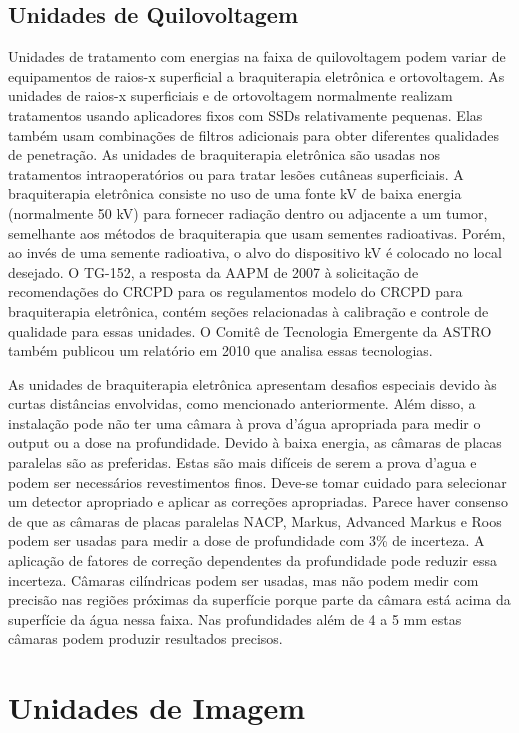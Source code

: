 \documentclass[11pt,a4paper]{article}
\begin{document}
\subsection*{Unidades de Quilovoltagem}

	Unidades de tratamento com energias na faixa de quilovoltagem podem variar de equipamentos de raios-x superficial a braquiterapia eletrônica e ortovoltagem. As unidades de raios-x superficiais e de ortovoltagem normalmente realizam tratamentos usando aplicadores fixos com SSDs relativamente pequenas. Elas também usam combinações de filtros adicionais para obter diferentes qualidades de penetração. As unidades de braquiterapia eletrônica são usadas nos tratamentos intraoperatórios ou para tratar lesões cutâneas superficiais. A braquiterapia eletrônica consiste no uso de uma fonte kV de baixa energia (normalmente 50 kV) para fornecer radiação dentro ou adjacente a um tumor, semelhante aos métodos de braquiterapia que usam sementes radioativas. Porém, ao invés de uma semente radioativa, o alvo do dispositivo kV é colocado no local desejado. O TG-152, a resposta da AAPM de 2007 à solicitação de recomendações do CRCPD para os regulamentos modelo do CRCPD para braquiterapia eletrônica, contém seções relacionadas à calibração e controle de qualidade para essas unidades. O Comitê de Tecnologia Emergente da ASTRO também publicou um relatório em 2010 que analisa essas tecnologias.

	As unidades de braquiterapia eletrônica apresentam desafios especiais devido às curtas distâncias envolvidas, como mencionado anteriormente. Além disso, a instalação pode não ter uma câmara à prova d'água apropriada para medir o output ou a dose na profundidade. Devido à baixa energia, as câmaras de placas paralelas são as preferidas. Estas são mais difíceis de serem a prova d'agua e podem ser necessários revestimentos finos. Deve-se tomar cuidado para selecionar um detector apropriado e aplicar as correções apropriadas. Parece haver consenso de que as câmaras de placas paralelas NACP, Markus, Advanced Markus e Roos podem ser usadas para medir a dose de profundidade com 3\% de incerteza. A aplicação de fatores de correção dependentes da profundidade pode reduzir essa incerteza. Câmaras cilíndricas podem ser usadas, mas não podem medir com precisão nas regiões próximas da superfície porque parte da câmara está acima da superfície da água nessa faixa. Nas profundidades além de 4 a 5 mm estas câmaras podem produzir resultados precisos.

\section{Unidades de Imagem}
\end{document}
